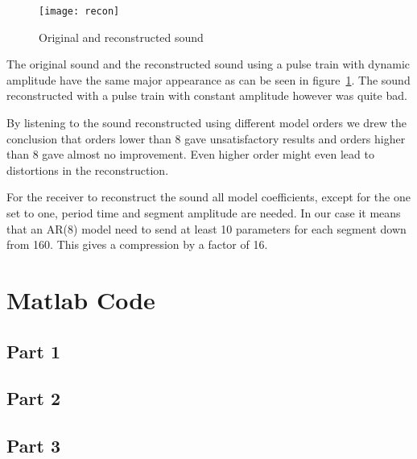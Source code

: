 \documentclass[10pt]{article}
\begin{document}
\begin{figure}[!hp]

    \begin{center}
      \texttt{[image: recon]}
    \caption{Original and reconstructed sound\label{fig:recon}}
    \end{center}

\end{figure}

The original sound and the reconstructed sound using a pulse train
with dynamic amplitude have the same major appearance as can be seen in
figure~\ref{fig:recon}. The sound reconstructed with a pulse train with
constant amplitude however was quite bad.

By listening to the sound reconstructed using different model orders
we drew the conclusion that orders lower than $8$ gave unsatisfactory
results and orders higher than $8$ gave almost no improvement.
Even higher order might even lead to distortions in the reconstruction.

For the receiver to reconstruct the sound all model coefficients,
except for the one set to one, period time and segment amplitude are needed.
In our case it means that an AR(8) model need to send at least 10 parameters
for each segment down from 160. This gives a compression by a
factor of 16.

\newpage
\clearpage
\section*{Matlab Code}

\subsection*{Part 1}

\newpage
\subsection*{Part 2}

\newpage
\subsection*{Part 3}

\end{document}
